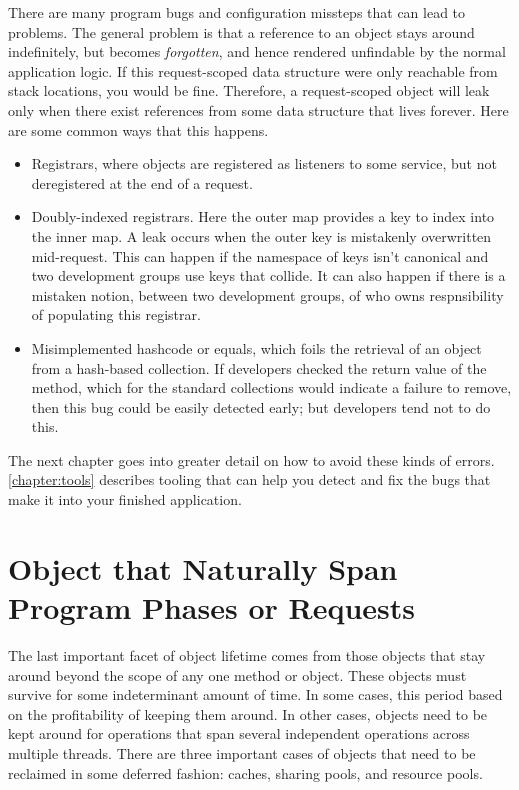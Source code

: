 There are many program bugs and configuration missteps that can lead to
problems. The general problem is that a reference to an object stays around
indefinitely, but becomes
\emph{forgotten}, and hence rendered unfindable by the normal application
logic. If this request-scoped data structure were only reachable from stack
locations, you would be fine. Therefore, a request-scoped object will leak only
when there exist references from some data structure that lives forever. Here
are some common ways that this happens.

\begin{itemize}
  \item Registrars, where objects are registered as listeners to some service,
  but not deregistered at the end of a request.
  \item Doubly-indexed registrars. Here the outer map provides a key to index
  into the inner map. A leak occurs when the outer key is mistakenly
  overwritten mid-request. This can happen if the namespace of keys isn't
  canonical and two development groups use keys that collide. It can also
  happen if there is a mistaken notion, between two development groups, of who
  owns respnsibility of populating this registrar.
  \item Misimplemented hashcode or equals, which foils the retrieval of an
  object from a hash-based collection. If developers checked the return value of
  the  method, which for the standard collections would indicate a failure to remove, then
  this bug could be easily detected early; but developers tend not to do this.
\end{itemize}

The next chapter goes into greater detail on how to avoid these kinds of
errors. \autoref{chapter:tools} describes tooling that can help you
detect and fix the bugs that make it into your finished application.


\section{Object that Naturally Span Program Phases or Requests}
\label{sec:correlated-with-need}

The last important facet of object lifetime comes from those objects that stay
around beyond the scope of any one method or object. These objects must survive
for some indeterminant amount of time. In some cases, this period based on the
profitability of keeping them around. In other cases, objects need to be kept
around for operations that span several independent operations across multiple
threads.
There are three important cases of objects that need to be reclaimed in some
deferred fashion: caches, sharing pools, and resource pools.


